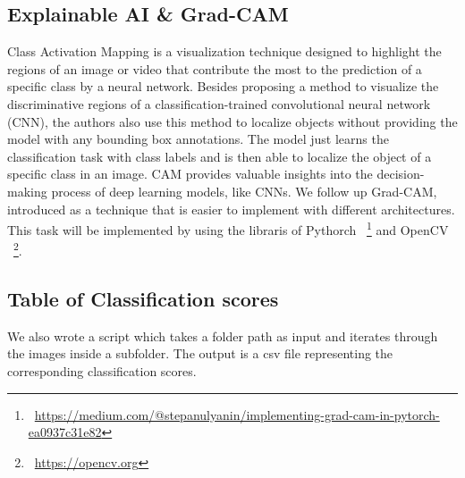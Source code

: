 \subsection{Explainable AI \& Grad-CAM}
\label{sec:optim:cam}
Class Activation Mapping\cite{zhou_learning_2016} is a visualization technique designed to highlight the regions of an image or video that contribute the most to the prediction of a specific class by a neural network. 
Besides proposing a method to visualize the discriminative regions of a classification-trained convolutional neural network (CNN), the authors also use this method to localize objects without providing the model with any bounding box annotations. The model just learns the classification task with class labels and is then able to localize the object of a specific class in an image. 
CAM provides valuable insights into the decision-making process of deep learning models, like CNNs.
We follow up Grad-CAM\cite{almeida_grad-cam_2023}, introduced as a technique that is easier to implement with different architectures.
This task will be implemented by using the libraris of Pythorch
~\footnote{~\url{https://medium.com/@stepanulyanin/implementing-grad-cam-in-pytorch-ea0937c31e82}}
and OpenCV
~\footnote{~\url{https://opencv.org}}.

\subsection{Table of Classification scores}
\label{sec:optim:csv}
We also wrote a script which takes a folder path as input and iterates through the images inside a subfolder. The output is a csv file representing the corresponding classification scores. 

